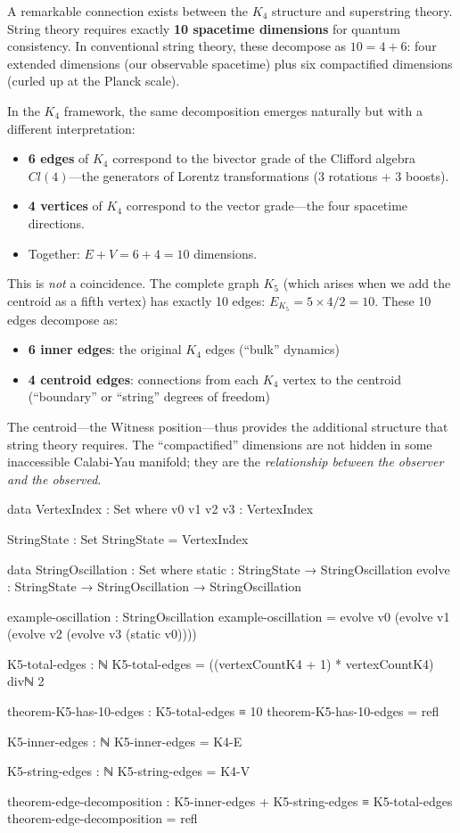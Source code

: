 \documentclass[11pt,a4paper]{book}
\begin{document}
A remarkable connection exists between the $K_4$ structure and superstring theory. 
String theory requires exactly \textbf{10 spacetime dimensions} for quantum consistency. 
In conventional string theory, these decompose as $10 = 4 + 6$: four extended 
dimensions (our observable spacetime) plus six compactified dimensions (curled up 
at the Planck scale).

In the $K_4$ framework, the same decomposition emerges naturally but with a 
different interpretation:
\begin{itemize}
\item \textbf{6 edges} of $K_4$ correspond to the bivector grade of the Clifford 
  algebra $Cl(4)$---the generators of Lorentz transformations (3 rotations + 3 boosts).
\item \textbf{4 vertices} of $K_4$ correspond to the vector grade---the four 
  spacetime directions.
\item Together: $E + V = 6 + 4 = 10$ dimensions.
\end{itemize}

This is \emph{not} a coincidence. The complete graph $K_5$ (which arises when we 
add the centroid as a fifth vertex) has exactly 10 edges: $E_{K_5} = 5 \times 4 / 2 = 10$. 
These 10 edges decompose as:
\begin{itemize}
\item \textbf{6 inner edges}: the original $K_4$ edges (``bulk'' dynamics)
\item \textbf{4 centroid edges}: connections from each $K_4$ vertex to the centroid 
  (``boundary'' or ``string'' degrees of freedom)
\end{itemize}

The centroid---the Witness position---thus provides the additional structure that 
string theory requires. The ``compactified'' dimensions are not hidden in some 
inaccessible Calabi-Yau manifold; they are the \emph{relationship between the 
observer and the observed}.

\begin{code}
data VertexIndex : Set where
  v0 v1 v2 v3 : VertexIndex

StringState : Set
StringState = VertexIndex

data StringOscillation : Set where
  static : StringState → StringOscillation
  evolve : StringState → StringOscillation → StringOscillation

example-oscillation : StringOscillation
example-oscillation = evolve v0 (evolve v1 (evolve v2 (evolve v3 (static v0))))

K5-total-edges : ℕ
K5-total-edges = ((vertexCountK4 + 1) * vertexCountK4) divℕ 2

theorem-K5-has-10-edges : K5-total-edges ≡ 10
theorem-K5-has-10-edges = refl

K5-inner-edges : ℕ
K5-inner-edges = K4-E

K5-string-edges : ℕ
K5-string-edges = K4-V

theorem-edge-decomposition : K5-inner-edges + K5-string-edges ≡ K5-total-edges
theorem-edge-decomposition = refl
\end{code}
\end{document}
